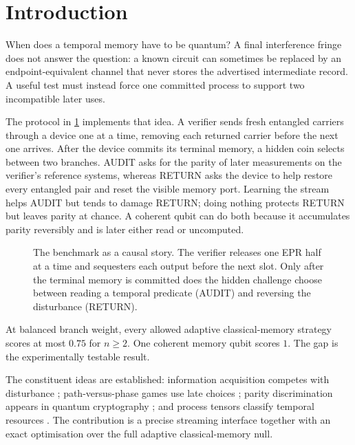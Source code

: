 \section{Introduction}

When does a temporal memory have to be quantum? A final interference fringe does not answer the question: a known circuit can sometimes be replaced by an endpoint-equivalent channel that never stores the advertised intermediate record. A useful test must instead force one committed process to support two incompatible later uses.

The protocol in \cref{fig:protocol} implements that idea. A verifier sends fresh entangled carriers through a device one at a time, removing each returned carrier before the next one arrives. After the device commits its terminal memory, a hidden coin selects between two branches. AUDIT asks for the parity of later measurements on the verifier's reference systems, whereas RETURN asks the device to help restore every entangled pair and reset the visible memory port. Learning the stream helps AUDIT but tends to damage RETURN; doing nothing protects RETURN but leaves parity at chance. A coherent qubit can do both because it accumulates parity reversibly and is later either read or uncomputed.

\begin{figure}[t]
\centering

\caption{The benchmark as a causal story. The verifier releases one EPR half at a time and sequesters each output before the next slot. Only after the terminal memory is committed does the hidden challenge choose between reading a temporal predicate (AUDIT) and reversing the disturbance (RETURN).}
\label{fig:protocol}
\end{figure}

\begin{takeaway}
At balanced branch weight, every allowed adaptive classical-memory strategy scores at most $0.75$ for $n\geq2$. One coherent memory qubit scores $1$. The gap is the experimentally testable result.
\end{takeaway}

The constituent ideas are established: information acquisition competes with disturbance \cite{banaszek2001fidelity}; path-versus-phase games use late choices \cite{bagan2018duality}; parity discrimination appears in quantum cryptography \cite{bennett1996parity}; and process tensors classify temporal resources \cite{chiribella2009networks,pollock2018processes,taranto2024hierarchy}. The contribution is a precise streaming interface together with an exact optimisation over the full adaptive classical-memory null.

